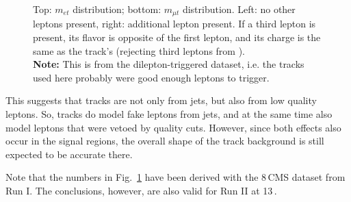 \begin{figure}
\begin{center}
	\caption{Top: $m_{et}$ distribution; bottom: $m_{\mu t}$ distribution. Left: no other leptons present, right: additional lepton present. If a third lepton is present, its flavor is opposite of the first lepton, and its charge is the same as the track's (rejecting third leptons from \Z).\\
	\textbf{Note:} This is from the dilepton-triggered dataset, i.e. the tracks used here probably were good enough leptons to trigger.
	\label{fig:app:MOSSFlepton,track}}
\end{center}
\end{figure}

This suggests that tracks are not only from jets, but also from low quality leptons. So, tracks do model fake leptons from jets, and at the same time also model leptons that were vetoed by quality cuts. However, since both effects also occur in the signal regions, the overall shape of the track background is still expected to be accurate there.

Note that the numbers in Fig.~\ref{fig:app:MOSSFlepton,track} have been derived with the 8\,\TeV CMS dataset from Run I. The conclusions, however, are also valid for Run II at 13\,\TeV.
